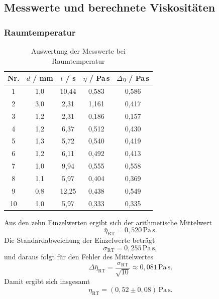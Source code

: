 \documentclass{report}
\begin{document}
\subsection{Messwerte und berechnete Viskositäten}

\subsubsection{Raumtemperatur}

\begin{table}[H]
\centering
\caption{Auswertung der Messwerte bei Raumtemperatur}
\begin{tabular}{c c c c c}
\toprule
Nr. & $d$ / mm & $t$ / s & $\eta$ / Pa\,s & $\Delta \eta$ / Pa\,s \\
\midrule
1  & 1{,}0 & 10{,}44 & 0{,}583 & 0{,}586 \\
2  & 3{,}0 & 2{,}31  & 1{,}161 & 0{,}417 \\
3  & 1{,}2 & 2{,}31  & 0{,}186 & 0{,}157 \\
4  & 1{,}2 & 6{,}37  & 0{,}512 & 0{,}430 \\
5  & 1{,}3 & 5{,}72  & 0{,}540 & 0{,}419 \\
6  & 1{,}2 & 6{,}11  & 0{,}492 & 0{,}413 \\
7  & 1{,}0 & 9{,}94  & 0{,}555 & 0{,}558 \\
8  & 1{,}1 & 5{,}97  & 0{,}404 & 0{,}369 \\
9  & 0{,}8 & 12{,}25 & 0{,}438 & 0{,}549 \\
10 & 1{,}0 & 5{,}97  & 0{,}333 & 0{,}335 \\
\bottomrule
\end{tabular}
\end{table}

Aus den zehn Einzelwerten ergibt sich der arithmetische Mittelwert
\begin{equation}
    \bar{\eta}_{\mathrm{RT}} = 0{,}520\,\mathrm{Pa\,s}.
\end{equation}
Die Standardabweichung der Einzelwerte beträgt
\begin{equation}
    \sigma_{\mathrm{RT}} = 0{,}255\,\mathrm{Pa\,s},
\end{equation}
und daraus folgt für den Fehler des Mittelwertes
\begin{equation}
    \Delta \bar{\eta}_{\mathrm{RT}}
    = \frac{\sigma_{\mathrm{RT}}}{\sqrt{10}}
    \approx 0{,}081\,\mathrm{Pa\,s}.
\end{equation}
Damit ergibt sich insgesamt
\begin{equation}
    \eta_{\mathrm{RT}} = (0{,}52 \pm 0{,}08)\,\mathrm{Pa\,s}.
\end{equation}
\end{document}
